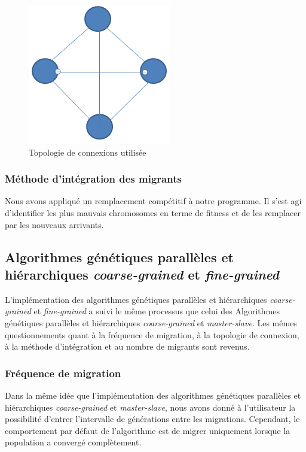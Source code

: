 	\begin{figure}[!h]
		\begin{center}
			\includegraphics[scale=.3]{images/topology_fig.png}
			\caption{Topologie de connexions utilisée}
			\label{fig:topology_fig}
		\end{center}
	\end{figure}
	
	\subsubsection{Méthode d'intégration des migrants}
 	
 	Nous avons appliqué un remplacement compétitif à notre programme. Il s'est agi d'identifier les plus mauvais chromosomes en terme de fitness et de les remplacer par les nouveaux arrivants.
 	
	\subsection{Algorithmes génétiques parallèles et hiérarchiques \emph{coarse-grained} et \emph{fine-grained}}
	
	L'implémentation des algorithmes génétiques parallèles et hiérarchiques \emph{coarse-grained} et \emph{fine-grained} a suivi le même processus que celui des Algorithmes génétiques parallèles et hiérarchiques \emph{coarse-grained} et \emph{master-slave}. Les mêmes questionnements quant à la fréquence de migration, à la topologie de connexion, à la méthode d'intégration et au nombre de migrants sont revenus.
	
	\subsubsection{Fréquence de migration}
	
	\hspace*{.5cm} Dans la même idée que l'implémentation des algorithmes génétiques parallèles et hiérarchiques \emph{coarse-grained} et \emph{master-slave}, nous avons donné à l'utilisateur la possibilité d'entrer l'intervalle de générations entre les migrations. Cependant, le comportement par défaut de l'algorithme est de migrer uniquement lorsque la population a convergé complètement.  
	
